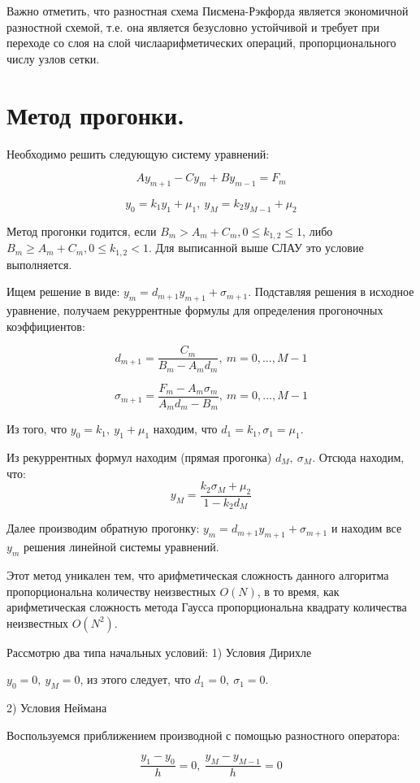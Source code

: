 \documentclass[a4paper,14pt]{article}
\begin{document}
Важно отметить, что разностная схема Писмена-Рэкфорда является экономичной разностной схемой, т.е. она является безусловно устойчивой и требует при переходе со слоя на слой числаарифметических операций, пропорционального числу узлов сетки.

\section{Метод прогонки.}
Необходимо решить следующую систему уравнений:

$$A y_{m+1} - C y_m + B y_{m-1}=F_m$$

$$y_0 = k_1 y_1 + \mu_1, \ y_M = k_2 y_{M-1} + \mu_2$$

Метод прогонки годится, если $B_m > A_m + C_m, 0 \leq k_{1,2} \leq 1$, либо
$B_m \geq A_m + C_m, 0  \leq  k_{1,2} < 1$. Для выписанной выше СЛАУ это условие выполняется.

Ищем решение в виде: $y_m = d_{m+1}y_{m+1}+\sigma_{m+1}$. Подставляя решения в исходное уравнение, получаем рекуррентные формулы для определения прогоночных коэффициентов:

$$d_{m+1} = \frac{C_m}{B_m-A_m d_m}, \ m=0,...,M-1$$

$$\sigma_{m+1}=\frac{F_m-A_m \sigma_m}{A_m d_m - B_m}, \ m=0,...,M-1$$

\noindent Из того, что $y_0 = k_1, \ y_1 + \mu_1$ находим, что $d_1 = k_1, \sigma_1 = \mu_1$.

Из рекуррентных формул находим (прямая прогонка) $d_M, \ \sigma_M$. Отсюда находим, что: $$y_M= \frac{k_2 \sigma_M + \mu_2}{1-k_2 d_M}$$

Далее производим обратную прогонку: $y_m = d_{m+1}y_{m+1}+\sigma_{m+1}$ и находим все $y_m$ решения линейной системы уравнений.

Этот метод уникален тем, что арифметическая сложность данного алгоритма пропорциональна количеству неизвестных $O(N)$, в то время, как арифметическая сложность метода Гаусса пропорциональна квадрату количества неизвестных $O(N^2)$.

Рассмотрю два типа начальных условий: 1) Условия Дирихле

\noindent $y_0 = 0, \ y_M = 0$, из этого следует, что $d_1 = 0, \ \sigma_1 = 0$. 

2) Условия Неймана

\noindent Воспользуемся приближением производной с помощью разностного оператора:

$$\frac{y_1 - y_0}{h} = 0, \ \frac{y_M - y_{M-1}}{h} = 0$$
\end{document}
